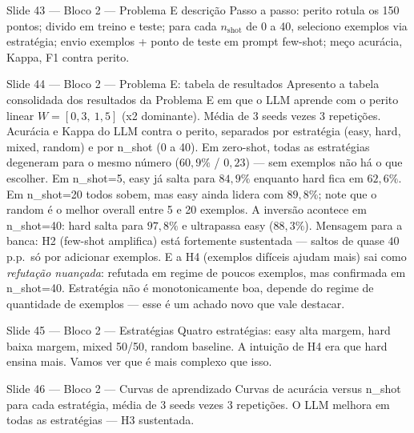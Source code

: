 \documentclass[aspectratio=169,10pt]{beamer}
\begin{document}
\begin{frame}{Slide 43 --- Bloco 2 --- Problema E descri\c{c}\~ao}
\footnotesize
Passo a passo: perito rotula os 150 pontos; divido em treino e teste; para cada $n_{\text{shot}}$ de 0 a 40, seleciono exemplos via estrat\'egia; envio exemplos + ponto de teste em prompt few-shot; me\c{c}o acur\'acia, Kappa, F1 contra perito.
\end{frame}

\begin{frame}{Slide 44 --- Bloco 2 --- Problema E: tabela de resultados}
\footnotesize
Apresento a tabela consolidada dos resultados da Problema E em que o LLM aprende com o perito linear $W=[0{,}3,\ 1{,}5]$ (x2 dominante). M\'edia de 3 seeds vezes 3 repeti\c{c}\~oes. Acur\'acia e Kappa do LLM contra o perito, separados por estrat\'egia (easy, hard, mixed, random) e por n\_shot (0 a 40). Em zero-shot, todas as estrat\'egias degeneram para o mesmo n\'umero ($60{,}9\%$ / $0{,}23$) --- sem exemplos n\~ao h\'a o que escolher. Em n\_shot=5, easy j\'a salta para $84{,}9\%$ enquanto hard fica em $62{,}6\%$. Em n\_shot=20 todos sobem, mas easy ainda lidera com $89{,}8\%$; note que o random \'e o melhor overall entre 5 e 20 exemplos. A invers\~ao acontece em n\_shot=40: hard salta para $97{,}8\%$ e ultrapassa easy ($88{,}3\%$). Mensagem para a banca: H2 (few-shot amplifica) est\'a fortemente sustentada --- saltos de quase $40$ p.p.\ s\'o por adicionar exemplos. E a H4 (exemplos dif\'iceis ajudam mais) sai como \emph{refuta\c{c}\~ao nuan\c{c}ada}: refutada em regime de poucos exemplos, mas confirmada em n\_shot=40. Estrat\'egia n\~ao \'e monotonicamente boa, depende do regime de quantidade de exemplos --- esse \'e um achado novo que vale destacar.
\end{frame}

\begin{frame}{Slide 45 --- Bloco 2 --- Estrat\'egias}
\footnotesize
Quatro estrat\'egias: easy alta margem, hard baixa margem, mixed 50/50, random baseline. A intui\c{c}\~ao de H4 era que hard ensina mais. Vamos ver que \'e mais complexo que isso.
\end{frame}

\begin{frame}{Slide 46 --- Bloco 2 --- Curvas de aprendizado}
\footnotesize
Curvas de acur\'acia versus n\_shot para cada estrat\'egia, m\'edia de 3 seeds vezes 3 repeti\c{c}\~oes. O LLM melhora em todas as estrat\'egias --- H3 sustentada.
\end{frame}
\end{document}
